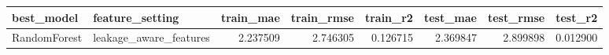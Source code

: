 \begin{tabular}{llrrrrrr}
\toprule
best\_model & feature\_setting & train\_mae & train\_rmse & train\_r2 & test\_mae & test\_rmse & test\_r2 \\
\midrule
RandomForest & leakage\_aware\_features & 2.237509 & 2.746305 & 0.126715 & 2.369847 & 2.899898 & 0.012900 \\
\bottomrule
\end{tabular}
